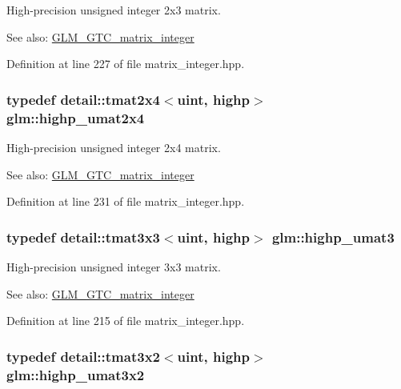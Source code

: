 High-precision unsigned integer 2x3 matrix. \begin{Desc}
\item[See also:]\hyperlink{group__gtc__matrix__integer}{GLM\_\-GTC\_\-matrix\_\-integer} \end{Desc}


Definition at line 227 of file matrix\_\-integer.hpp.\hypertarget{group__gtc__matrix__integer_gbe8572c228aecc0bfa7ba92415b1c651}{
\subsubsection[highp\_\-umat2x4]{\setlength{\rightskip}{0pt plus 5cm}typedef detail::tmat2x4$<$uint, highp$>$ {\bf glm::highp\_\-umat2x4}}}
\label{group__gtc__matrix__integer_gbe8572c228aecc0bfa7ba92415b1c651}


High-precision unsigned integer 2x4 matrix. \begin{Desc}
\item[See also:]\hyperlink{group__gtc__matrix__integer}{GLM\_\-GTC\_\-matrix\_\-integer} \end{Desc}


Definition at line 231 of file matrix\_\-integer.hpp.\hypertarget{group__gtc__matrix__integer_g2a271939d0123103f088e325e5123385}{
\subsubsection[highp\_\-umat3]{\setlength{\rightskip}{0pt plus 5cm}typedef detail::tmat3x3$<$uint, highp$>$ {\bf glm::highp\_\-umat3}}}
\label{group__gtc__matrix__integer_g2a271939d0123103f088e325e5123385}


High-precision unsigned integer 3x3 matrix. \begin{Desc}
\item[See also:]\hyperlink{group__gtc__matrix__integer}{GLM\_\-GTC\_\-matrix\_\-integer} \end{Desc}


Definition at line 215 of file matrix\_\-integer.hpp.\hypertarget{group__gtc__matrix__integer_g6f6a73ec605a515fb21d779663082ef9}{
\subsubsection[highp\_\-umat3x2]{\setlength{\rightskip}{0pt plus 5cm}typedef detail::tmat3x2$<$uint, highp$>$ {\bf glm::highp\_\-umat3x2}}}
\label{group__gtc__matrix__integer_g6f6a73ec605a515fb21d779663082ef9}


